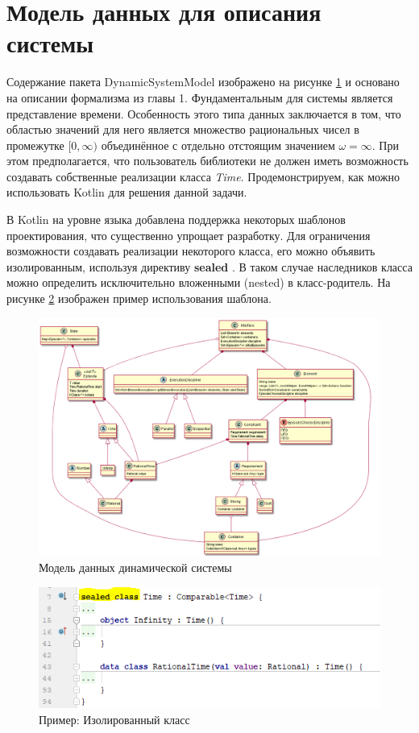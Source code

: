\section{Модель данных для описания системы}
Содержание пакета DynamicSystemModel изображено на рисунке \ref{fig:datamodel} и основано на описании формализма из главы 1.
Фундаментальным для системы является представление времени.
Особенность этого типа данных заключается в том, что областью значений для него является множество рациональных чисел в промежутке $ [0,\infty) $ объединённое с отдельно отстоящим значением $ \omega = \infty $.
При этом предполагается, что пользователь библиотеки не должен иметь возможность создавать собственные реализации класса \textit{Time}.
Продемонстрируем, как можно использовать Kotlin для решения данной задачи.

В Kotlin на уровне языка добавлена поддержка некоторых шаблонов проектирования, что существенно упрощает разработку.
Для ограничения возможности создавать реализации некоторого класса, его можно объявить изолированным, используя директиву \textbf{sealed} \cite{samuel2017programming}.
В таком случае наследников класса можно определить исключительно вложенными (nested) в класс-родитель.
На рисунке \ref{fig:sealed-class} изображен пример использования шаблона.

\begin{figure}[h]
	\centering
	\includegraphics[width=0.9\linewidth]{images/datamodel}
	\caption{Модель данных динамической системы}
	\label{fig:datamodel}
\end{figure}

\begin{figure}[h]
	\centering
	\includegraphics[width=0.7\linewidth]{images/sealed-class}
	\caption{Пример: Изолированный класс}
	\label{fig:sealed-class}
\end{figure}
\FloatBarrier

